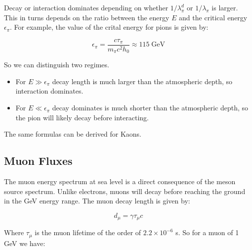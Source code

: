 \documentclass[
  letterpaper,
  DIV=11,
  numbers=noendperiod]{scrreprt}
\begin{document}
\begin{tcolorbox}[enhanced jigsaw, colframe=quarto-callout-note-color-frame, opacitybacktitle=0.6, left=2mm, leftrule=.75mm, opacityback=0, colbacktitle=quarto-callout-note-color!10!white, breakable, bottomrule=.15mm, toprule=.15mm, colback=white, coltitle=black, bottomtitle=1mm, toptitle=1mm, titlerule=0mm, title=\textcolor{quarto-callout-note-color}{\faInfo}\hspace{0.5em}{Critical energy for mesons, \(\pi\), \(K\)}, arc=.35mm, rightrule=.15mm]

Decay or interaction dominates depending on whether \(1/\lambda^d_\pi\)
or \(1/\lambda_\pi\) is larger. This in turns depends on the ratio
between the energy \(E\) and the critical energy \(\epsilon_\pi\). For
example, the value of the crital energy for pions is given by:

\[\epsilon_\pi = \frac{c\tau_\pi}{m_\pi c^2 h_0} \approx 115 \;\mathrm{ GeV}\]

So we can distinguish two regimes.

\begin{itemize}
\item
  For \(E \gg \epsilon_\pi\) decay length is much larger than the
  atmospheric depth, so interaction dominates.
\item
  For \(E \ll \epsilon_\pi\) decay dominates is much shorter than the
  atmospheric depth, so the pion will likely decay before interacting.
\end{itemize}

The same formulas can be derived for Kaons.

\end{tcolorbox}

\subsection*{Muon Fluxes}\label{muon-fluxes}

The muon energy spectrum at sea level is a direct consequence of the
meson source spectrum. Unlike electrons, muons will decay before
reaching the ground in the GeV energy range. The muon decay length is
given by:

\[ d_\mu = \gamma \tau_\mu c\]

Where \(\tau_\mu\) is the muon lifetime of the order of
\(2.2\times 10^{-6}\) s. So for a muon of 1 GeV we have:
\end{document}
